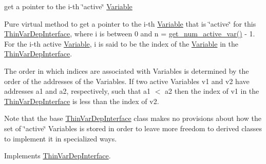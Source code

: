 get a pointer to the i-\/th \char`\"{}active\char`\"{} \mbox{\hyperlink{class_s_m_spp__di__unipi__it_1_1_variable}{Variable}} 

Pure virtual method to get a pointer to the i-\/th \mbox{\hyperlink{class_s_m_spp__di__unipi__it_1_1_variable}{Variable}} that is \char`\"{}active\char`\"{} for this \mbox{\hyperlink{class_s_m_spp__di__unipi__it_1_1_thin_var_dep_interface}{Thin\+Var\+Dep\+Interface}}, where i is between 0 and n = \mbox{\hyperlink{class_s_m_spp__di__unipi__it_1_1_f_real_objective_acc8ac3c57cc2c71ac3fe6c409fe53074}{get\+\_\+num\+\_\+active\+\_\+var()}} -\/ 1. For the i-\/th active \mbox{\hyperlink{class_s_m_spp__di__unipi__it_1_1_variable}{Variable}}, i is said to be the index of the \mbox{\hyperlink{class_s_m_spp__di__unipi__it_1_1_variable}{Variable}} in the \mbox{\hyperlink{class_s_m_spp__di__unipi__it_1_1_thin_var_dep_interface}{Thin\+Var\+Dep\+Interface}}.

The order in which indices are associated with Variables is determined by the order of the addresses of the Variables. If two active Variables v1 and v2 have addresses a1 and a2, respectively, such that a1 $<$ a2 then the index of v1 in the \mbox{\hyperlink{class_s_m_spp__di__unipi__it_1_1_thin_var_dep_interface}{Thin\+Var\+Dep\+Interface}} is less than the index of v2.

Note that the base \mbox{\hyperlink{class_s_m_spp__di__unipi__it_1_1_thin_var_dep_interface}{Thin\+Var\+Dep\+Interface}} class makes no provisions about how the set of \char`\"{}active\char`\"{} Variables is stored in order to leave more freedom to derived classes to implement it in specialized ways. 

Implements \mbox{\hyperlink{group___thin_var_dep_interface___c_l_a_s_s_e_s_ga1967518603f9424434460d4ba8676c37}{Thin\+Var\+Dep\+Interface}}.

\mbox{\label{class_s_m_spp__di__unipi__it_1_1_f_real_objective_af420d3dff49afbccc8a0c2de86374eeb}} 
